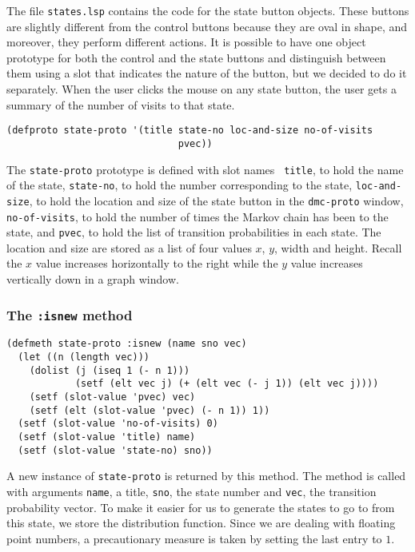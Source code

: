 The file {\tt states.lsp} contains the code for the state button
objects.  These buttons are slightly different from the control
buttons because they are oval in shape, and moreover, they perform
different actions. It is possible to have one object prototype for
both the control and the state buttons and distinguish between them
using a slot that indicates the nature of the button, but we decided
to do it separately. When the user clicks the mouse on any 
state button, the user gets a summary of the number of visits to that
state. 

\begin{verbatim}
(defproto state-proto '(title state-no loc-and-size no-of-visits 
                              pvec))
\end{verbatim}
The {\tt state-proto} prototype is defined with slot names {\tt
  title}, to hold the name of the state, {\tt state-no}, to hold the
number corresponding to the state, {\tt loc-and-size}, to hold the
location and size of the state button in the {\tt dmc-proto} window,
{\tt no-of-visits}, to hold the number of times the Markov chain has
been to the state, and {\tt pvec}, to hold the list of transition
probabilities in each state.  The location and size are stored as a
list of four values $x$, $y$, width and height. Recall the $x$ value
increases horizontally to the right while the $y$ value increases
vertically down in a graph window.  

\subsubsection{The {\tt :isnew} method}
\label{subsubsec:state-isnew}
\begin{verbatim}
(defmeth state-proto :isnew (name sno vec)
  (let ((n (length vec)))
    (dolist (j (iseq 1 (- n 1)))
            (setf (elt vec j) (+ (elt vec (- j 1)) (elt vec j))))
    (setf (slot-value 'pvec) vec)
    (setf (elt (slot-value 'pvec) (- n 1)) 1))
  (setf (slot-value 'no-of-visits) 0)
  (setf (slot-value 'title) name)
  (setf (slot-value 'state-no) sno))
\end{verbatim}
A new instance of {\tt state-proto} is returned by this method.  The
method is called with arguments {\tt name}, a title, {\tt sno}, the
state number and {\tt vec}, the transition probability vector.
To make it easier for us to generate the states to go to from this
state, we store the distribution function.  Since we are dealing with
floating point numbers, a precautionary measure is taken by setting
the last entry to $1$. 

